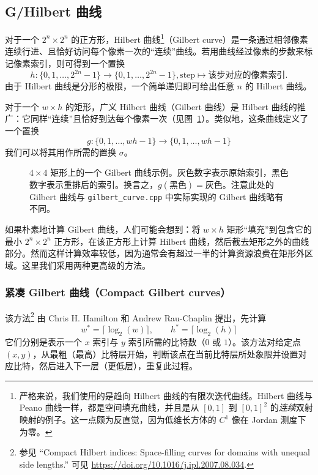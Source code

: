 \documentclass[12pt, a4paper, twoside]{article}
\begin{document}
\subsection{G/Hilbert 曲线}

对于一个 $2^n \times 2^n$ 的正方形，Hilbert 曲线\footnote{严格来说，我们使用的是趋向 Hilbert 曲线的有限次迭代曲线。Hilbert 曲线与 Peano 曲线一样，都是空间填充曲线，并且是从 $[0,1]$ 到 $[0,1]^2$ 的\emph{连续}双射映射的例子。这一点颇为反直觉，因为低维长方体的 $C^1$ 像在 Jordan 测度下为零。}（Gilbert curve）是一条通过相邻像素连续行进、且恰好访问每个像素一次的“连续”曲线。若用曲线经过像素的步数来标记像素索引，则可得到一个置换
\begin{equation}
    h\colon \{0, 1, \ldots, 2^{2n} - 1\} \to \{0, 1, \ldots, 2^{2n} - 1\}, \text{step} \mapsto \text{该步对应的像素索引}.
\end{equation}
由于 Hilbert 曲线是分形的极限，一个简单递归即可给出任意 $n$ 的 Hilbert 曲线。

对于一个 $w \times h$ 的矩形，广义 Hilbert 曲线（Gilbert 曲线）是 Hilbert 曲线的推广：它同样“连续”且恰好到达每个像素一次（见图~\ref{fig:gilbert_curve}）。类似地，这条曲线定义了一个置换
\begin{equation}
    g\colon \{0, 1, \ldots, w h - 1\} \to \{0, 1, \ldots, w h - 1\}
\end{equation}
我们可以将其用作所需的置换 $\sigma$。

\begin{figure}[t!]
\centering

\caption{$4 \times 4$ 矩形上的一个 Gilbert 曲线示例。灰色数字表示原始索引，黑色数字表示重排后的索引。换言之，$g(\text{黑色}) = \text{灰色}$。注意此处的 Gilbert 曲线与 \texttt{gilbert\_curve.cpp} 中实际实现的 Gilbert 曲线略有不同。}
\label{fig:gilbert_curve}
\end{figure}

如果朴素地计算 Gilbert 曲线，人们可能会想到：将 $w \times h$ 矩形“填充”到包含它的最小 $2^n \times 2^n$ 正方形，在该正方形上计算 Hilbert 曲线，然后截去矩形之外的曲线部分。然而这样计算效率较低，因为通常会有超过一半的计算资源浪费在矩形外区域。这里我们采用两种更高级的方法。

\subsubsection{紧凑 Gilbert 曲线（Compact Gilbert curves）}

该方法\footnote{参见 ``Compact Hilbert indices: Space-filling curves for domains with unequal side lengths.'' 可见 \url{https://doi.org/10.1016/j.ipl.2007.08.034}.} 由 Chris H. Hamilton 和 Andrew Rau-Chaplin 提出，先计算
\begin{equation}
    w^* = \lceil \log_2(w) \rceil, \qquad h^* = \lceil \log_2(h) \rceil
\end{equation}
它们分别是表示一个 $x$ 索引与 $y$ 索引所需的比特数（$0$ 或 $1$）。该方法对给定点 $(x,y)$，从最粗（最高）比特层开始，判断该点在当前比特层所处象限并设置对应比特，然后进入下一层（更低层），重复此过程。
\end{document}
